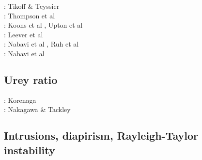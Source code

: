 \begin{scriptsize}
\nineteenninetyfour: Tikoff \& Teyssier \cite{tite94}\\
\nineteenninetyseven: Thompson et al \cite{thsj97}\\
\twothousandthree: Koons et al \cite{konc03}, Upton et al \cite{upke03}\\
\twothousandeleven: Leever et al \cite{legs11}\\
\twothousandseventeen: Nabavi et al \cite{naam17}, Ruh et al \cite{rugb17}\\
\twothousandeighteen: Nabavi et al \cite{naam18}
\end{scriptsize}

\subsection{Urey ratio}

\begin{scriptsize}
\twothousandeight: Korenaga \cite{kore08}\\
\twothousandtwelve: Nakagawa \& Tackley \cite{nata12}
\end{scriptsize}

\subsection{Intrusions, diapirism, Rayleigh-Taylor instability}

